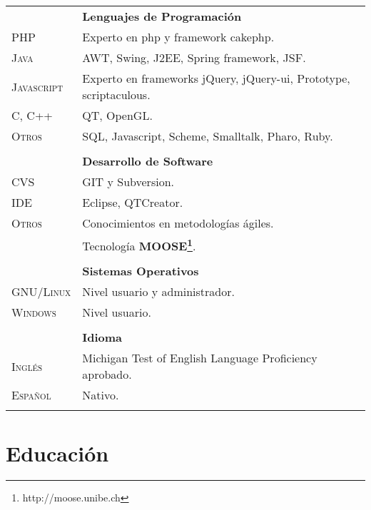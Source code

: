 \documentclass[letterpaper, oneside, final, 12pt]{scrartcl}
\newcommand{\gray}{\rowcolor[gray]{.90}}
\begin{document}
\begin{center}
\begin{tabularx}{0.97\linewidth}{>{\raggedleft\scshape}p{2.5cm}X}
					& \textbf{Lenguajes de Programaci\'on} \\
\gray	PHP			& Experto en php y framework cakephp. \\
\gray	Java		& AWT, Swing, J2EE, Spring framework, JSF. \\
\gray	Javascript	& Experto en frameworks jQuery, jQuery-ui, Prototype, scriptaculous. \\
\gray	C, C++		& QT, OpenGL. \\
\gray	Otros		& SQL, Javascript, Scheme, Smalltalk, Pharo, Ruby. \\
					& \\
					& \textbf{Desarrollo de Software} \\
\gray	CVS			& GIT y Subversion. \\
\gray	IDE			& Eclipse, QTCreator. \\
\gray	Otros		& Conocimientos en metodolog\'ias \'agiles.\\
\gray				& Tecnolog\'ia \textbf{MOOSE\footnote{http://moose.unibe.ch}}. \\
					& \\
					& \textbf{Sistemas Operativos} \\
\gray	GNU/Linux	& Nivel usuario y administrador. \\
\gray	Windows 	& Nivel usuario. \\
					& \\
					& \textbf{Idioma} \\
\gray	Ingl\'es	& Michigan Test of English Language Proficiency aprobado. \\
\gray	Espa\~nol	& Nativo. \\
					& \\
\end{tabularx}

\section{Educaci\'on}


\end{center}
\end{document}
